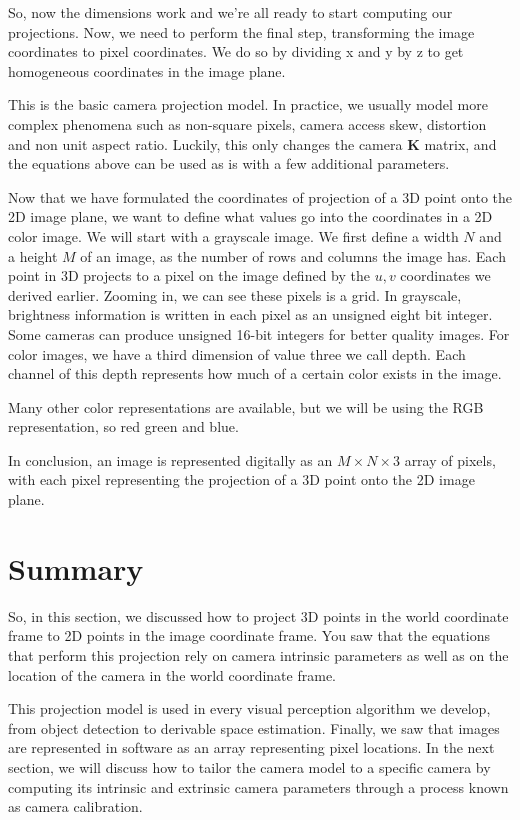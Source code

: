 So, now the dimensions
work and we're all ready to start computing
our projections. Now, we need to perform
the final step, transforming the image
coordinates to pixel coordinates. We do so by dividing x and y by z to get homogeneous coordinates
in the image plane. 

This is the basic  camera projection model. In practice, we usually model more complex phenomena
such as non-square pixels, camera access skew, distortion
and non unit aspect ratio. Luckily, this only changes
the camera $\mathbf{K}$ matrix, and the equations above can be used as is with a few
additional parameters. 

Now that we have formulated
the coordinates of projection of a 3D point onto
the 2D image plane, we want to define
what values go into the coordinates in
a 2D color image. We will start with
a grayscale image. We first define a width $N$
and a height $M$ of an image, as the number of rows and
columns the image has. Each point in 3D projects
to a pixel on the image defined by the $u, v$ coordinates
we derived earlier. Zooming in, we can see
these pixels is a grid. In grayscale, brightness
information is written in each pixel as
an unsigned eight bit integer. Some cameras can produce unsigned 16-bit integers
for better quality images. For color images, we have a third dimension of value
three we call depth. Each channel of
this depth represents how much of a certain color
exists in the image. 


Many other color
representations are available, but we will be using
the RGB representation, so red green and blue. 

In conclusion, an image is represented digitally as an $M \times N \times 3$ array of pixels, with each pixel
representing the projection of a 3D point onto
the 2D image plane. 

\section{Summary}

So, in this section, we discussed how to project 3D points in the world coordinate frame to 2D points in
the image coordinate frame. You saw that the equations that perform this projection rely on camera intrinsic
parameters as well as on the location of the camera in the world coordinate frame.  

This projection model is used in every visual perception algorithm we develop, from object detection to
derivable space estimation. Finally, we saw that images are represented in software as an array
representing pixel locations.  In the next section, we will discuss how to
tailor the camera model to a specific camera by computing its intrinsic and extrinsic
camera parameters through a process known as camera calibration.
